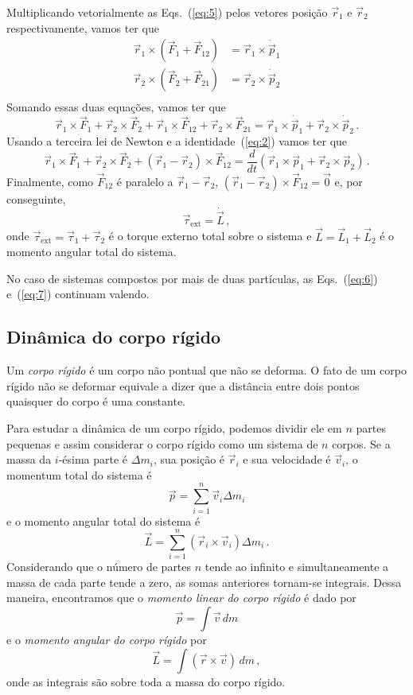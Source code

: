 \documentclass[twocolumn=on,DIV=calc]{scrartcl}
\theoremstyle{definition}
\begin{document}
Multiplicando vetorialmente as Eqs.~(\ref{eq:5}) pelos vetores posição
$\vec r_1$ e $\vec r_2$ respectivamente, vamos ter que
\begin{equation*}
  \begin{split}
    \vec r_1\times(\vec F_1+\vec F_{12})&=\vec r_1\times\dot{\vec p}_1\\
    \vec r_2\times(\vec F_2+\vec F_{21})&=\vec r_2\times\dot{\vec p}_2\\
  \end{split}
\end{equation*}
Somando essas duas equações, vamos ter que
$$\vec r_1\times\vec F_1+\vec r_2\times\vec F_2+\vec r_1\times\vec F_{12}+\vec r_2\times\vec F_{21}=\vec r_1\times\dot{\vec p}_1+\vec r_2\times\dot{\vec p}_2\,.$$
Usando a terceira lei de Newton e a identidade~(\ref{eq:2}) vamos ter
que
$$\vec r_1\times\vec F_1+\vec r_2\times\vec F_2+(\vec r_1-\vec r_2)\times\vec F_{12}=\frac{d}{dt}(\vec r_1\times\vec p_1+\vec r_2\times\vec p_2)\,.$$
Finalmente, como $\vec F_{12}$ é paralelo a
$\vec r_1-\vec r_2$,
$(\vec r_1-\vec r_2)\times\vec F_{12}=\vec 0$ e, por
conseguinte,
\begin{equation}
  \label{eq:7}
  \vec\tau_{\mathrm{ext}}=\dot{\vec L}\,,
\end{equation}
onde
$\vec\tau_{\mathrm{ext}}=\vec\tau_1+\vec\tau_2$
é o torque externo total sobre o sistema e
$\vec L=\vec L_1+\vec L_2$ é o momento angular total do
sistema.

No caso de sistemas compostos por mais de duas partículas, as Eqs.~(\ref{eq:6}) e~(\ref{eq:7}) continuam valendo.

\subsection{Dinâmica do corpo rígido}

Um \textit{corpo rígido} é um corpo não pontual que não se deforma. O
fato de um corpo rígido não se deformar equivale a dizer que a
distância entre dois pontos quaisquer do corpo é uma constante.

Para estudar a dinâmica de um corpo rígido, podemos dividir ele em $n$
partes pequenas e assim considerar o corpo rígido como um sistema de
$n$ corpos. Se a massa da $i$-ésima parte é $\Delta m_i$, sua posição
é $\vec r_i$ e sua velocidade é $\vec v_i$, o momentum total do
sistema é
$$\vec p=\sum_{i=1}^n\vec v_i\Delta m_i$$
e o momento angular total do sistema é
$$\vec L=\sum_{i=1}^n(\vec r_i\times\vec v_i)\Delta m_i\,.$$
Considerando que o número de partes $n$ tende ao infinito e
simultaneamente a massa de cada parte tende a zero, as somas
anteriores tornam-se integrais. Dessa maneira, encontramos que o
\textit{momento linear do corpo rígido} é dado por
\begin{equation}
  \label{eq:8}
  \vec p=\int \vec v\,dm
\end{equation}
e o \textit{momento angular do corpo rígido} por
\begin{equation}
  \label{eq:9}
  \vec L=\int (\vec r\times\vec v)\,dm\,,
\end{equation}
onde as integrais são sobre toda a massa do corpo rígido.
\end{document}
